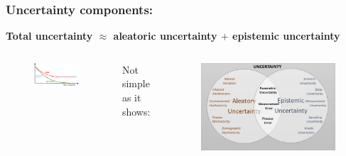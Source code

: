 \begin{frame}
\frametitle{Uncertainty components:}
\Large\textbf{Total uncertainty $\approx$ aleatoric uncertainty $+$ epistemic uncertainty}

\begin{columns}

\begin{figure}
\includegraphics[scale=2.5]{figures/figure-total_Uncertainty.pdf}
\end{figure}
Not simple as it shows:
\centering
\begin{figure}
\includegraphics[scale=0.5]{figures/figure-uncertainty_classification.png}
\end{figure}
\end{columns}   
\end{frame}

